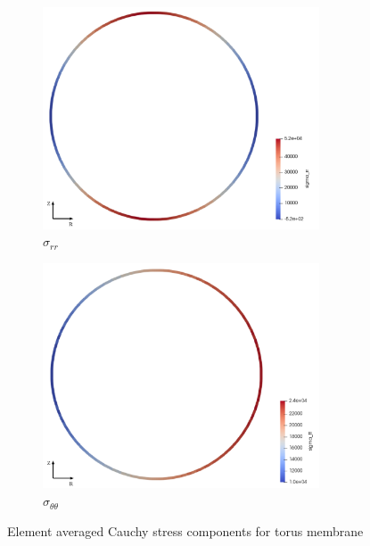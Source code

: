 \documentclass[11pt,a4paper,final]{article}
\begin{document}
\begin{figure}[ht!]
\centering 
\begin{subfigure}[b]{0.49\textwidth}
\centering
\includegraphics[width=0.9\textwidth]{membrane_avg_sigma_rr_mue_1e6.pdf}
\caption{$\sigma_{rr}$}
\label{fig:1.11.1}
\end{subfigure}
\begin{subfigure}[b]{0.49\textwidth}
\centering
\includegraphics[width=0.9\textwidth]{membrane_avg_sigma_tt_mue_1e6.pdf}
\caption{$\sigma_{\theta \theta}$}
\label{fig:1.11.2}
\end{subfigure}
\caption{Element averaged Cauchy stress components for torus membrane}
\label{fig:1.11}
\end{figure} 
\end{document}
